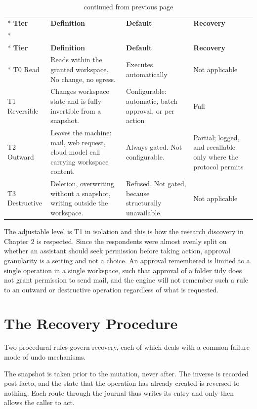 \documentclass{FastFyp}
\begin{document}
{
\begin{longtable}{|p{2.4cm}|p{4.6cm}|p{3.4cm}|p{3.0cm}|}
\caption{The four risk tiers.}\label{tab:tiers}\\*
\hline
\textbf{Tier} & \textbf{Definition} & \textbf{Default} & \textbf{Recovery} \\*
\hline
\endfirsthead
\caption[]{continued from previous page}\\*
\hline
\textbf{Tier} & \textbf{Definition} & \textbf{Default} & \textbf{Recovery} \\*
\hline
\endhead
\hline
T0 Read & Reads within the granted workspace. No change, no egress. & Executes automatically & Not applicable \\
\hline
T1 Reversible & Changes workspace state and is fully invertible from a snapshot. & Configurable: automatic, batch approval, or per action & Full \\
\hline
T2 Outward & Leaves the machine: mail, web request, cloud model call carrying workspace content. & Always gated. Not configurable. & Partial; logged, and recallable only where the protocol permits \\
\hline
T3 Destructive & Deletion, overwriting without a snapshot, writing outside the workspace. & Refused. Not gated, because structurally unavailable. & Not applicable \\
\hline
\end{longtable}
}

The adjustable level is T1 in isolation and this is how the research discovery in Chapter 2 is respected. Since the respondents were almost evenly split on whether an assistant should seek permission before taking action, approval granularity is a setting and not a choice. An approval remembered is limited to a single operation in a single workspace, such that approval of a folder tidy does not grant permission to send mail, and the engine will not remember such a rule to an outward or destructive operation regardless of what is requested.

\section{The Recovery Procedure}
Two procedural rules govern recovery, each of which deals with a common failure mode of undo mechanisms.

The snapshot is taken prior to the mutation, never after. The inverse is recorded post facto, and the state that the operation has already created is reversed to nothing. Each route through the journal thus writes its entry and only then allows the caller to act.
\end{document}
